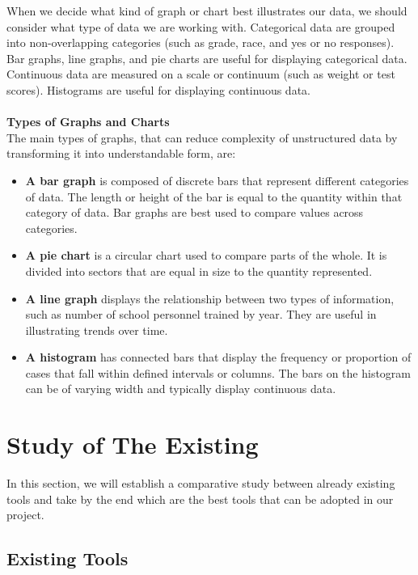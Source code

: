 When we decide what kind of graph or chart best illustrates our data, we should consider what type of data we are working with. Categorical data are grouped into non-overlapping categories (such as grade, race, and yes or no responses). Bar graphs, line graphs, and pie charts are useful for displaying categorical data. Continuous data are measured on a scale or continuum (such as weight or test scores). Histograms are useful for displaying continuous data.\\
~\\
\textbf{\normalsize{Types of Graphs and Charts}}\\

The main types of graphs, that can reduce complexity of unstructured data by transforming it into understandable form, are:\\
\begin{itemize}
\item \textbf{A bar graph} is composed of discrete bars  that represent different categories of data. The length or height of the bar is equal to the quantity within that category of data. Bar graphs are best used to compare values across categories.\\
\item \textbf{A pie chart} is a circular chart used to compare parts of the whole. It is divided into sectors that are equal in size to the quantity represented.\\
\item \textbf{A line graph} displays the relationship between two types of information, such as number of school personnel trained by year. They are useful in illustrating trends over time.\\
\item \textbf{A histogram} has connected bars that display the frequency or proportion of cases that fall within defined intervals or columns. The bars on the histogram can be of varying width and typically display continuous data.\\ 
\end{itemize}



\newpage
\section{Study of The Existing}
In this section, we will establish a comparative study between already existing tools and take by the end which are the best tools that can be adopted in our project. 
\subsection{Existing Tools}
